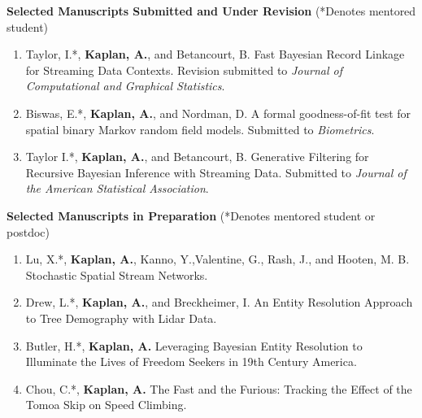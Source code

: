 \documentclass[margin,line]{res}
\begin{document}
\begin{resume}
{\bf Selected Manuscripts Submitted and Under Revision} (*Denotes mentored student) \\
\begin{enumerate}
\item Taylor, I.*, {\bf Kaplan, A.}, and Betancourt, B. Fast Bayesian Record Linkage for Streaming Data Contexts. Revision submitted to {\em Journal of Computational and Graphical Statistics}.
\item Biswas, E.*, {\bf Kaplan, A.}, and Nordman, D. A formal goodness-of-fit test for spatial binary Markov random field models. Submitted to {\em Biometrics}.
\item Taylor I.*, {\bf Kaplan, A.}, and Betancourt, B. Generative Filtering for Recursive Bayesian Inference with Streaming Data. Submitted to {\em Journal of the American Statistical Association}.
\end{enumerate}

{\bf Selected Manuscripts in Preparation} (*Denotes mentored student or postdoc) \\
\begin{enumerate}
\item Lu, X.*, \mkbibbold{Kaplan, A.}, Kanno, Y.,Valentine, G., Rash, J., and Hooten, M. B. Stochastic Spatial Stream Networks.
\item Drew, L.*, {\bf Kaplan, A.}, and Breckheimer, I. An Entity Resolution Approach to Tree Demography with Lidar Data.
\item Butler, H.*, {\bf Kaplan, A.} Leveraging Bayesian Entity Resolution to Illuminate the Lives of Freedom Seekers in 19th Century America.
\item Chou, C.*, {\bf Kaplan, A.} The Fast and the Furious: Tracking the Effect of the Tomoa Skip on Speed Climbing.
\end{enumerate}









\end{resume}
\end{document}
